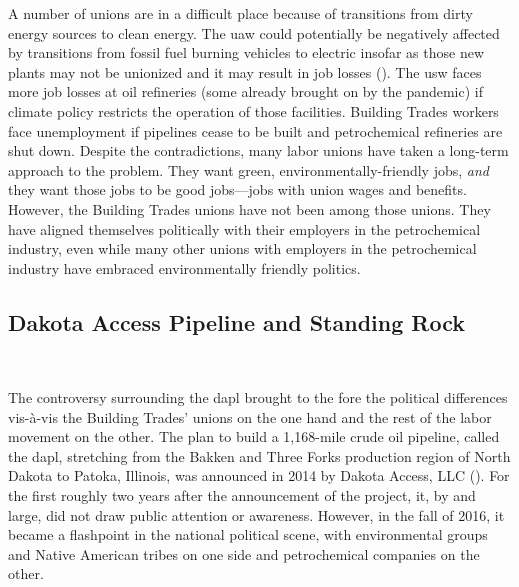 \documentclass[12pt]{article}
\begin{document}
A number of unions are in a difficult place because of transitions from dirty energy sources to clean energy. The \acrfull{uaw} could potentially be negatively affected by transitions from fossil fuel burning vehicles to electric insofar as those new plants may not be unionized and it may result in job losses (\cite{feeleyElectricVehicleFactories2023}). The \acrfull{usw} faces more job losses at oil refineries (some already brought on by the pandemic) if climate policy restricts the operation of those facilities. Building Trades workers face unemployment if pipelines cease to be built and petrochemical refineries are shut down. Despite the contradictions, many labor unions have taken a long-term approach to the problem. They want green, environmentally-friendly jobs, \emph{and} they want those jobs to be good jobs---jobs with union wages and benefits. However, the Building Trades unions have not been among those unions. They have aligned themselves politically with their employers in the petrochemical industry, even while many other unions with employers in the petrochemical industry have embraced environmentally friendly politics.

\subsection{Dakota Access Pipeline and Standing Rock}\

The controversy surrounding the \acrfull{dapl} brought to the fore the political differences vis-\`a-vis the Building Trades' unions on the one hand and the rest of the labor movement on the other. The plan to build a 1,168-mile crude oil pipeline, called the \acrshort{dapl}, stretching from the Bakken and Three Forks production region of North Dakota to Patoka, Illinois, was announced in 2014 by Dakota Access, LLC (\cite{oconnellDakotaAccessPipeline2018, sahaFiveThingsKnow2016, usarmycorpsofengineersDakotaAccessPipeline}). For the first roughly two years after the announcement of the project, it, by and large, did not draw public attention or awareness. However, in the fall of 2016, it became a flashpoint in the national political scene, with environmental groups and Native American tribes on one side and petrochemical companies on the other. 
\end{document}
